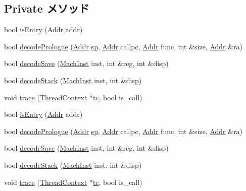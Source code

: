 \subsection*{Private メソッド}
\begin{DoxyCompactItemize}
\item 
bool \hyperlink{classMipsISA_1_1StackTrace_a8c9787d05f9c0e82dfcaf31cf0fd4b50}{isEntry} (\hyperlink{classm5_1_1params_1_1Addr}{Addr} addr)
\item 
bool \hyperlink{classMipsISA_1_1StackTrace_a875eea16b2891accc8cbec7eb6c36003}{decodePrologue} (\hyperlink{classm5_1_1params_1_1Addr}{Addr} \hyperlink{namespaceMipsISA_aec732cfc085807a8a81c2534c69cea56}{sp}, \hyperlink{classm5_1_1params_1_1Addr}{Addr} callpc, \hyperlink{classm5_1_1params_1_1Addr}{Addr} func, int \&size, \hyperlink{classm5_1_1params_1_1Addr}{Addr} \&ra)
\item 
bool \hyperlink{classMipsISA_1_1StackTrace_ae56dad5982b67d8717714c383b6a59f8}{decodeSave} (\hyperlink{classMipsISA_1_1StackTrace_a3f35b9076070a26d3e479196d6234916}{MachInst} inst, int \&reg, int \&disp)
\item 
bool \hyperlink{classMipsISA_1_1StackTrace_a61ba7618f77dc6e62d7b0baf6273130c}{decodeStack} (\hyperlink{classMipsISA_1_1StackTrace_a3f35b9076070a26d3e479196d6234916}{MachInst} inst, int \&disp)
\item 
void \hyperlink{classMipsISA_1_1StackTrace_a46d6b95a2e5fdb75702cf45e39566645}{trace} (\hyperlink{classThreadContext}{ThreadContext} $\ast$\hyperlink{classMipsISA_1_1StackTrace_a7d1b4bb6199b71a875f0eb5d9c19022b}{tc}, bool is\_\-call)
\item 
bool \hyperlink{classMipsISA_1_1StackTrace_a8c9787d05f9c0e82dfcaf31cf0fd4b50}{isEntry} (\hyperlink{classm5_1_1params_1_1Addr}{Addr} addr)
\item 
bool \hyperlink{classMipsISA_1_1StackTrace_a875eea16b2891accc8cbec7eb6c36003}{decodePrologue} (\hyperlink{classm5_1_1params_1_1Addr}{Addr} \hyperlink{namespaceMipsISA_aec732cfc085807a8a81c2534c69cea56}{sp}, \hyperlink{classm5_1_1params_1_1Addr}{Addr} callpc, \hyperlink{classm5_1_1params_1_1Addr}{Addr} func, int \&size, \hyperlink{classm5_1_1params_1_1Addr}{Addr} \&ra)
\item 
bool \hyperlink{classMipsISA_1_1StackTrace_ae56dad5982b67d8717714c383b6a59f8}{decodeSave} (\hyperlink{classMipsISA_1_1StackTrace_a3f35b9076070a26d3e479196d6234916}{MachInst} inst, int \&reg, int \&disp)
\item 
bool \hyperlink{classMipsISA_1_1StackTrace_a61ba7618f77dc6e62d7b0baf6273130c}{decodeStack} (\hyperlink{classMipsISA_1_1StackTrace_a3f35b9076070a26d3e479196d6234916}{MachInst} inst, int \&disp)
\item 
void \hyperlink{classMipsISA_1_1StackTrace_a46d6b95a2e5fdb75702cf45e39566645}{trace} (\hyperlink{classThreadContext}{ThreadContext} $\ast$\hyperlink{classMipsISA_1_1StackTrace_a7d1b4bb6199b71a875f0eb5d9c19022b}{tc}, bool is\_\-call)
\end{DoxyCompactItemize}
